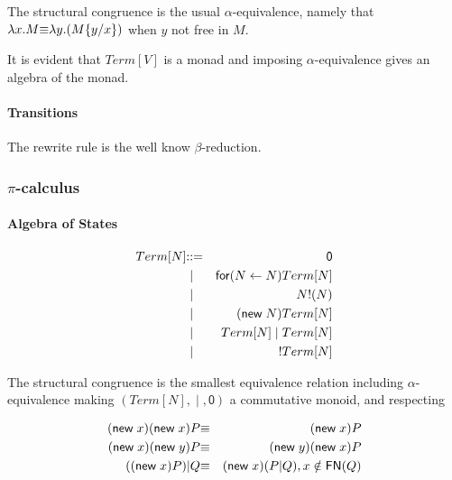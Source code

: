 The structural congruence is the usual $\alpha$-equivalence, namely that $\lambda x.M \scong \lambda y.(M\{y / x\})$ when $y$ not free in $M$.

It is evident that $Term[V]$ is a monad and imposing $\alpha$-equivalence gives an algebra of the monad.

\paragraph{Transitions}
The rewrite rule is the well know $\beta$-reduction.
\begin{mathpar}
\end{mathpar}

\subsubsection{$\pi$-calculus}

\paragraph{Algebra of States}
\begin{eqnarray*}
  Term[N] & \bc & \mathsf{0} \\
  & \;\bm\; & \mathsf{for}\mathsf{(}N \leftarrow N\mathsf{)}Term[N] \\
  & \;\bm\; & N\mathsf{!}\mathsf{(}N\mathsf{)} \\
  & \;\bm\; & \mathsf{(}\mathsf{new}\; N\mathsf{)}Term[N] \\
  & \;\bm\; & Term[N] \; \mathsf{|}\; Term[N] \\
  & \;\bm\; & \mathsf{!}Term[N]
\end{eqnarray*}

The structural congruence is the smallest equivalence relation including $\alpha$-equivalence making $(Term[N],\;\mathsf{|}\;,\mathsf{0})$ a commutative monoid, and respecting

\begin{eqnarray*}
  \mathsf{(}\mathsf{new}\; x\mathsf{)}\mathsf{(}\mathsf{new}\; x\mathsf{)}P & \scong & \mathsf{(}\mathsf{new}\; x\mathsf{)}P \\
  \mathsf{(}\mathsf{new}\; x\mathsf{)}\mathsf{(}\mathsf{new}\; y\mathsf{)}P & \scong & \mathsf{(}\mathsf{new}\; y\mathsf{)}\mathsf{(}\mathsf{new}\; x\mathsf{)}P \\
  (\mathsf{(}\mathsf{new}\; x\mathsf{)}P)\mathsf{|}Q & \scong & \mathsf{(}\mathsf{new}\; x\mathsf{)}(P\mathsf{|}Q), x \notin \freenames{Q}
\end{eqnarray*}

